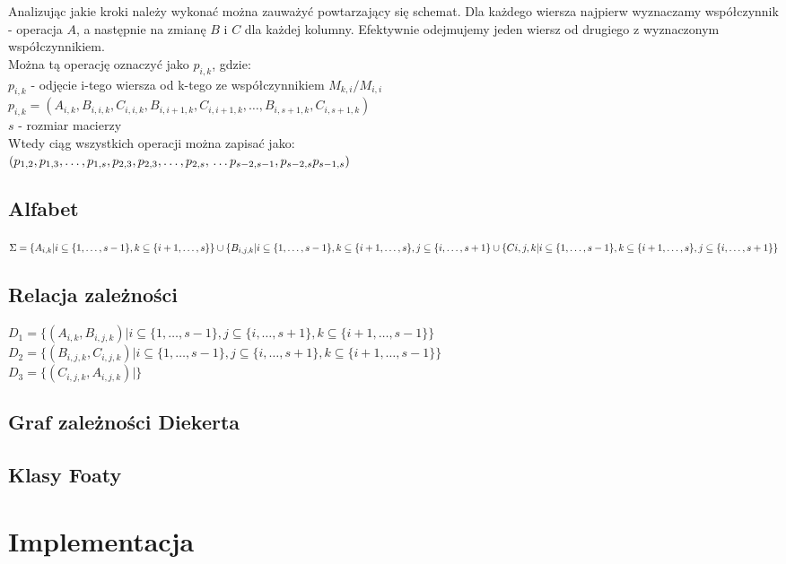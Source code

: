 \documentclass[12pt, letterpaper]{article}
\begin{document}
Analizując jakie kroki należy wykonać można zauważyć powtarzający się schemat.
Dla każdego  wiersza najpierw wyznaczamy współczynnik - operacja $A$, a następnie 
na zmianę  $B$ i $C$ dla każdej kolumny. Efektywnie odejmujemy jeden wiersz od drugiego z wyznaczonym współczynnikiem. \\
Można tą operację oznaczyć jako $p_{i,k}$, gdzie: \\
$ p_{i,k} $ - odjęcie i-tego wiersza od k-tego ze współczynnikiem $M_{k,i}/M_{i,i}$ \\
$ p_{i,k} = ( A_{i,k}, B_{i,i,k}, C_{i,i,k}, B_{i,i+1,k}, C_{i,i+1,k},\ldots,B_{i, s+1, k}, C_{i,s+1,k}) $ \\
$s$ - rozmiar macierzy \\
Wtedy ciąg wszystkich operacji można zapisać jako: \\
$ (p_{1,2}, p_{1,3}, \ldots, p_{1,s},\\
p_{2,3}, p_{2,3}, \ldots, p_{2, s},\\
\ldots\\
p_{s-2, s-1}, p_{s-2, s} \\
p_{s-1, s}
) $

\subsection{Alfabet}

$ \Sigma = \{ A_{i,k} | i \subseteq \{1, \ldots, s-1\}, k \subseteq \{ i+1, \ldots, s \}\} \cup \\
\{ B_{i,j,k} | i \subseteq \{1, \ldots, s-1\}, k \subseteq \{ i+1, \ldots, s \}, j \subseteq \{ i, \ldots, s+1 \} \cup \\
\{ C{i,j,k} | i \subseteq \{1, \ldots, s-1\}, k \subseteq \{ i+1, \ldots, s \}, j \subseteq \{ i, \ldots, s+1 \}\}$

\subsection{Relacja zależności}

$D_1 = \{ (A_{i,k}, B_{i, j, k}) | i \subseteq \{ 1, \ldots, s-1 \},j \subseteq \{ i, \ldots, s+1 \}, k \subseteq \{i+1, \ldots, s-1 \}\}$ \\
$D_2 = \{ (B_{i,j,k}, C_{i,j,k}) | i \subseteq \{ 1, \ldots, s-1 \},j \subseteq \{ i, \ldots, s+1 \}, k \subseteq \{i+1, \ldots, s-1 \}\}$ \\
$D_3 = \{ (C_{i,j,k}, A_{i,j,k}) | \}$ \\


\subsection{Graf zależności Diekerta}
\subsection{Klasy Foaty}

\section{Implementacja}
\end{document}
